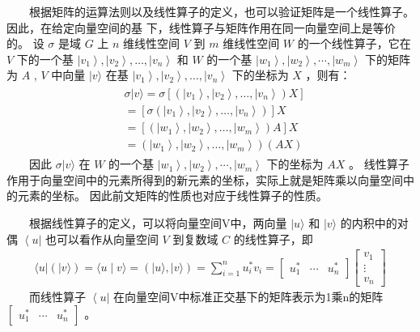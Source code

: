 \documentclass[a4paper,11pt,english]{sphinxmanual}
\begin{document}
\sphinxAtStartPar
​  根据矩阵的运算法则以及线性算子的定义，也可以验证矩阵是一个线性算子。因此，在给定向量空间的基 下，线性算子与矩阵作用在同一向量空间上是等价的。 设  \(\sigma\) 是域  \(G\) 上 \(n\)  维线性空间  \(V\)  到  \(m\) 维线性空间 \(W\)  的一个线性算子，它在  \(V\)  下的一个基  \(\left|v_{1}\right\rangle,\left|v_{2}\right\rangle, \ldots,\left|v_{n}\right\rangle\) 和 \(W\) 的一个基  \(\left|w_{1}\right\rangle,\left|w_{2}\right\rangle, \cdots,\left|w_{m}\right\rangle\) 下的矩阵为 \(A\) ,  \(V\) 中向量 \(|v\rangle\) 在基  \(\left|v_{1}\right\rangle,\left|v_{2}\right\rangle, \ldots,\left|v_{n}\right\rangle\) 下的坐标为  \(X\)  ，则有：
\begin{equation*}
\begin{split}\begin{aligned} &\sigma|v\rangle=\sigma\left[\left(\left|v_{1}\right\rangle,\left|v_{2}\right\rangle, \ldots,\left|v_{n}\right\rangle\right) X\right]\\ & =\left[\sigma\left(\left|v_{1}\right\rangle,\left|v_{2}\right\rangle, \ldots,\left|v_{n}\right\rangle\right)\right] X \\ &=\left[\left(\left|w_{1}\right\rangle,\left|w_{2}\right\rangle, \ldots,\left|w_{m}\right\rangle\right) A\right] X \\ &{=}\left(\left|w_{1}\right\rangle,\left|w_{2}\right\rangle, \ldots,\left|w_{m}\right\rangle\right)(A X) \end{aligned}\end{split}
\end{equation*}
\sphinxAtStartPar
​  因此  \(\sigma|v\rangle\) 在 \(W\) 的一个基  \(\left|w_{1}\right\rangle,\left|w_{2}\right\rangle, \cdots,\left|w_{m}\right\rangle\) 下的坐标为  \(A X\) 。 线性算子作用于向量空间中的元素所得到的新元素的坐标，实际上就是矩阵乘以向量空间中的元素的坐标。 因此前文矩阵的性质也对应于线性算子的性质。

\sphinxAtStartPar
​  根据线性算子的定义，可以将向量空间V中，两向量  \(| {u}\rangle\) 和 \(| {v}\rangle\) 的内积中的对偶  \(\left\langle {u} \right|\) 也可以看作从向量空间  \(V\) 到复数域 \(C\) 的线性算子，即
\begin{equation*}
\begin{split}\langle u|(|v\rangle)=\langle u \mid v\rangle=(|u\rangle,|v\rangle)=\sum_{i=1}^{n} u_{i}^{*} v_{i}=\left[\begin{array}{lll} u_{1}^{*} & \cdots & u_{n}^{*} \end{array}\right]\left[\begin{array}{c} v_{1} \\ \vdots \\ v_{n} \end{array}\right]\end{split}
\end{equation*}
\sphinxAtStartPar
​  而线性算子  \(\left\langle u\right|\) 在向量空间V中标准正交基下的矩阵表示为1乘n的矩阵  \(\left[\begin{array}{lll}u_{1}^{*} & \cdots & u_{n}^{*}\end{array}\right]\)  。
\end{document}
